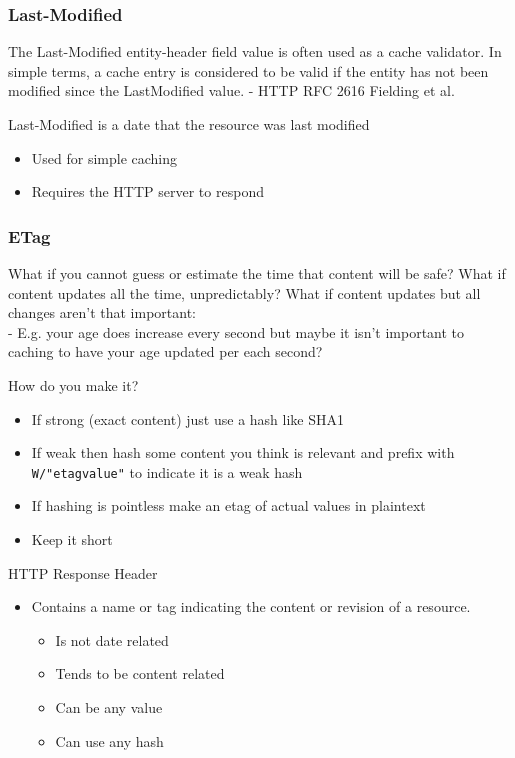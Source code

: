 \documentclass[../CMPUT-404-Notes.tex]{subfiles}
\begin{document}
\subsubsection{Last-Modified}
\begin{quotebox}
    The Last-Modified entity-header field value is
    often used as a cache validator. In simple
    terms, a cache entry is considered to be valid if
    the entity has not been modified since the LastModified value. - HTTP RFC 2616 Fielding et
    al.
\end{quotebox}
Last-Modified is a date that the resource was last modified
\begin{itemize}
    \item Used for simple caching
    \item Requires the HTTP server to respond
\end{itemize}

\subsubsection{ETag}
What if you cannot guess or estimate the time
that content will be safe?
What if content updates all the time, unpredictably?
What if content updates but all changes aren't
that important:\\
\noindent
- E.g. your age does increase every second but
maybe it isn't important to caching to have your
age updated per each second?

How do you make it?
\begin{itemize}
    \item If strong (exact content) just use a hash like SHA1
    \item If weak then hash some content you think is
    relevant and prefix with \texttt{W/"etagvalue"} to
    indicate it is a weak hash
    \item If hashing is pointless make an etag of actual
    values in plaintext
    \item Keep it short
\end{itemize}

HTTP Response Header
\begin{itemize}
    \item Contains a name or tag indicating the content
    or revision of a resource.
    \begin{itemize}
        \item Is not date related
        \item Tends to be content related
        \item Can be any value
        \item Can use any hash
    \end{itemize}
\end{itemize}
    
\end{document}
